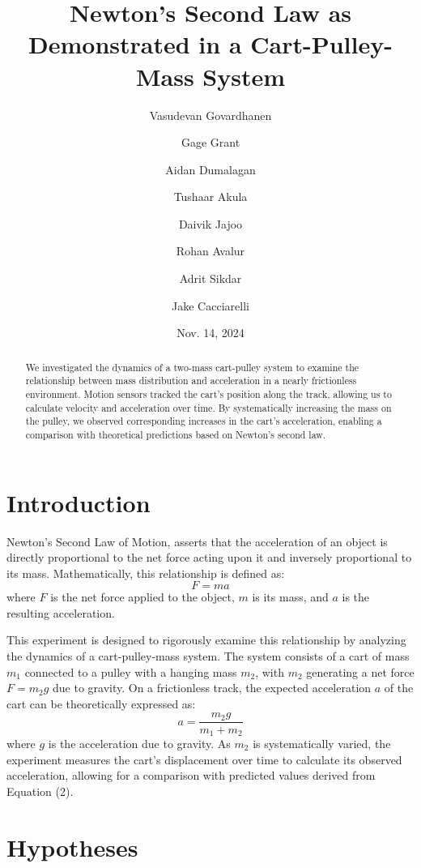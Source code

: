 \documentclass{article}
\title{Newton's Second Law as Demonstrated in a Cart-Pulley-Mass System}
\author[1]{Vasudevan Govardhanen}
\author[1]{Gage Grant}
\author[1]{Aidan Dumalagan}
\author[1]{Tushaar Akula}
\author[1]{Daivik Jajoo}
\author[1]{Rohan Avalur}
\author[1]{Adrit Sikdar}
\author[1]{Jake Cacciarelli}
\affil[1]{Manalapan High School, Dr. E's Pd. 1 AP Physics C: Mechanics Class}
\date{Nov. 14, 2024}
\begin{document}
\maketitle

\begin{abstract}
We investigated the dynamics of a two-mass cart-pulley system to examine the relationship between mass distribution and acceleration in a nearly frictionless environment. Motion sensors tracked the cart’s position along the track, allowing us to calculate velocity and acceleration over time. By systematically increasing the mass on the pulley, we observed corresponding increases in the cart's acceleration, enabling a comparison with theoretical predictions based on Newton’s second law.
\end{abstract}

\linespread{0.9}\selectfont

\section*{Introduction}
Newton's Second Law of Motion, asserts that the acceleration of an object is directly proportional to the net force acting upon it and inversely proportional to its mass. Mathematically, this relationship is defined as:
\begin{equation}
    F = ma
\end{equation}
where \( F \) is the net force applied to the object, \( m \) is its mass, and \( a \) is the resulting acceleration.

This experiment is designed to rigorously examine this relationship by analyzing the dynamics of a cart-pulley-mass system. The system consists of a cart of mass \( m_1 \) connected to a pulley with a hanging mass \( m_2 \), with \( m_2 \) generating a net force \( F = m_2 g \) due to gravity. On a frictionless track, the expected acceleration \( a \) of the cart can be theoretically expressed as:
\begin{equation}
    a = \frac{m_2 g}{m_1 + m_2}
\end{equation}
where \( g \) is the acceleration due to gravity. As \( m_2 \) is systematically varied, the experiment measures the cart's displacement over time to calculate its observed acceleration, allowing for a comparison with predicted values derived from Equation (2).

\section*{Hypotheses}
\end{document}
